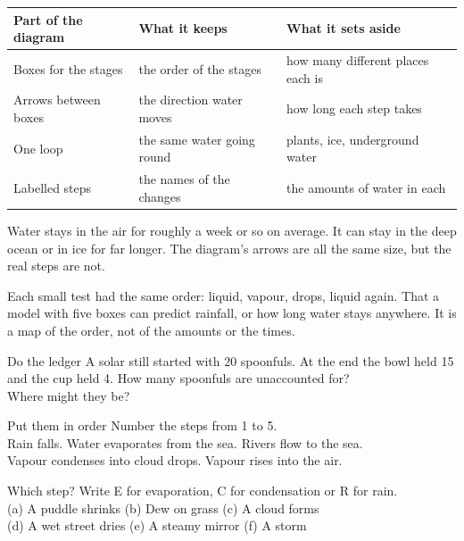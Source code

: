 \begin{center}
\sffamily\small\renewcommand{\arraystretch}{1.5}
\begin{tabular}{@{}p{3.4cm}p{3.7cm}p{3.7cm}@{}}
\toprule
\textbf{Part of the diagram} & \textbf{What it keeps} & \textbf{What it sets aside}\\
\midrule
Boxes for the stages & the order of the stages & how many different places each is\\
Arrows between boxes & the direction water moves & how long each step takes\\
One loop & the same water going round & plants, ice, underground water\\
Labelled steps & the names of the changes & the amounts of water in each\\
\bottomrule
\end{tabular}
\end{center}

Water stays in the air for roughly a week or so on average. It can stay in the deep ocean or in ice for far longer. The diagram's arrows are all the same size, but the real steps are not.

{Each small test had the same order: liquid, vapour, drops, liquid again.}
{That a model with five boxes can predict rainfall, or how long water stays anywhere. It is a map of the order, not of the amounts or the times.}

\clearpage

\begin{puzzle}{Do the ledger}
A solar still started with 20 spoonfuls. At the end the bowl held 15 and the cup held 4. How many spoonfuls are unaccounted for? \wline[1.6cm]\\
Where might they be? \wline[4cm]
\end{puzzle}

\begin{puzzle}{Put them in order}
Number the steps from 1 to 5.\\
\wline[1cm] Rain falls. \quad \wline[1cm] Water evaporates from the sea. \quad \wline[1cm] Rivers flow to the sea.\\
\wline[1cm] Vapour condenses into cloud drops. \quad \wline[1cm] Vapour rises into the air.
\end{puzzle}

\begin{puzzle}{Which step?}
Write E for evaporation, C for condensation or R for rain.\\
(a) A puddle shrinks \wline[1cm] \quad (b) Dew on grass \wline[1cm] \quad (c) A cloud forms \wline[1cm]\\
(d) A wet street dries \wline[1cm] \quad (e) A steamy mirror \wline[1cm] \quad (f) A storm \wline[1cm]
\end{puzzle}

